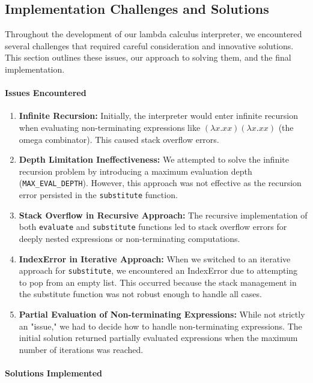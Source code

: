 \documentclass{article}
\theoremstyle{theorem}
\theoremstyle{definition}
\theoremstyle{remark}
\begin{document}
\subsection{Implementation Challenges and Solutions}

Throughout the development of our lambda calculus interpreter, we encountered several challenges that required careful consideration and innovative solutions. This section outlines these issues, our approach to solving them, and the final implementation.

\paragraph{Issues Encountered}

\begin{enumerate}
    \item \textbf{Infinite Recursion:} Initially, the interpreter would enter infinite recursion when evaluating non-terminating expressions like $(\lambda x.x x) (\lambda x.x x)$ (the omega combinator). This caused stack overflow errors.
    \item \textbf{Depth Limitation Ineffectiveness:} We attempted to solve the infinite recursion problem by introducing a maximum evaluation depth (\texttt{MAX\_EVAL\_DEPTH}). However, this approach was not effective as the recursion error persisted in the \texttt{substitute} function.
    \item \textbf{Stack Overflow in Recursive Approach:} The recursive implementation of both \texttt{evaluate} and \texttt{substitute} functions led to stack overflow errors for deeply nested expressions or non-terminating computations.
    \item \textbf{IndexError in Iterative Approach:} When we switched to an iterative approach for \texttt{substitute}, we encountered an IndexError due to attempting to pop from an empty list. This occurred because the stack management in the substitute function was not robust enough to handle all cases.
    \item \textbf{Partial Evaluation of Non-terminating Expressions:} While not strictly an "issue," we had to decide how to handle non-terminating expressions. The initial solution returned partially evaluated expressions when the maximum number of iterations was reached.
\end{enumerate}

\paragraph{Solutions Implemented}
\end{document}
